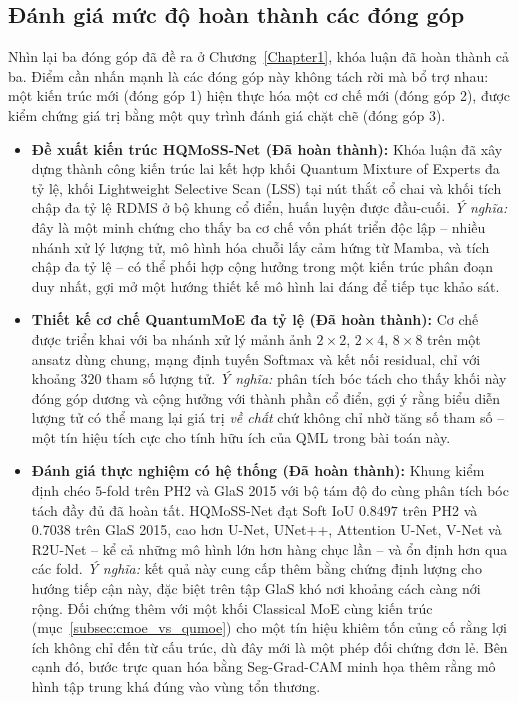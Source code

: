 \subsection{Đánh giá mức độ hoàn thành các đóng góp}
Nhìn lại ba đóng góp đã đề ra ở Chương~\ref{Chapter1}, khóa luận đã hoàn thành cả ba. Điểm cần nhấn mạnh là các đóng góp này không tách rời mà bổ trợ nhau: một kiến trúc mới (đóng góp 1) hiện thực hóa một cơ chế mới (đóng góp 2), được kiểm chứng giá trị bằng một quy trình đánh giá chặt chẽ (đóng góp 3).
\begin{itemize}
    \item \textbf{Đề xuất kiến trúc HQMoSS-Net (Đã hoàn thành):} Khóa luận đã xây dựng thành công kiến trúc lai kết hợp khối Quantum Mixture of Experts đa tỷ lệ, khối Lightweight Selective Scan (LSS) tại nút thắt cổ chai và khối tích chập đa tỷ lệ RDMS ở bộ khung cổ điển, huấn luyện được đầu-cuối. \emph{Ý nghĩa:} đây là một minh chứng cho thấy ba cơ chế vốn phát triển độc lập -- nhiều nhánh xử lý lượng tử, mô hình hóa chuỗi lấy cảm hứng từ Mamba, và tích chập đa tỷ lệ -- có thể phối hợp cộng hưởng trong một kiến trúc phân đoạn duy nhất, gợi mở một hướng thiết kế mô hình lai đáng để tiếp tục khảo sát.
    \item \textbf{Thiết kế cơ chế QuantumMoE đa tỷ lệ (Đã hoàn thành):} Cơ chế được triển khai với ba nhánh xử lý mảnh ảnh $2 \times 2$, $2 \times 4$, $8 \times 8$ trên một ansatz dùng chung, mạng định tuyến Softmax và kết nối residual, chỉ với khoảng $320$ tham số lượng tử. \emph{Ý nghĩa:} phân tích bóc tách cho thấy khối này đóng góp dương và cộng hưởng với thành phần cổ điển, gợi ý rằng biểu diễn lượng tử có thể mang lại giá trị \emph{về chất} chứ không chỉ nhờ tăng số tham số -- một tín hiệu tích cực cho tính hữu ích của QML trong bài toán này.
    \item \textbf{Đánh giá thực nghiệm có hệ thống (Đã hoàn thành):} Khung kiểm định chéo $5$-fold trên PH2 và GlaS 2015 với bộ tám độ đo cùng phân tích bóc tách đầy đủ đã hoàn tất. HQMoSS-Net đạt Soft IoU $0.8497$ trên PH2 và $0.7038$ trên GlaS 2015, cao hơn U-Net, UNet++, Attention U-Net, V-Net và R2U-Net -- kể cả những mô hình lớn hơn hàng chục lần -- và ổn định hơn qua các fold. \emph{Ý nghĩa:} kết quả này cung cấp thêm bằng chứng định lượng cho hướng tiếp cận này, đặc biệt trên tập GlaS khó nơi khoảng cách càng nới rộng. Đối chứng thêm với một khối Classical MoE cùng kiến trúc (mục~\ref{subsec:cmoe_vs_qumoe}) cho một tín hiệu khiêm tốn củng cố rằng lợi ích không chỉ đến từ cấu trúc, dù đây mới là một phép đối chứng đơn lẻ. Bên cạnh đó, bước trực quan hóa bằng Seg-Grad-CAM minh họa thêm rằng mô hình tập trung khá đúng vào vùng tổn thương.
\end{itemize}

